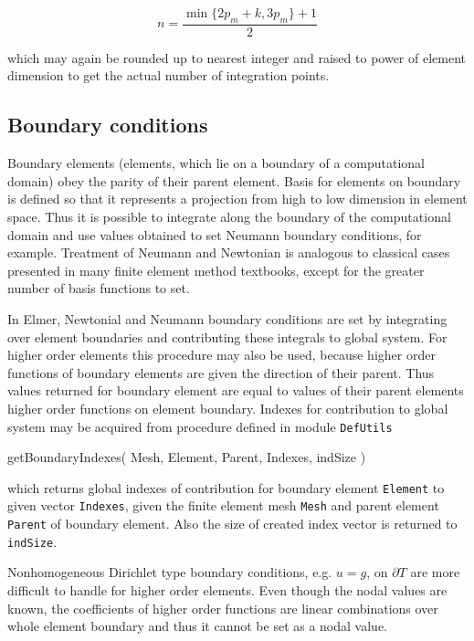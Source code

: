 \begin{equation}
n=\frac{\min{\{2p_m+k,3p_m\}}+1}{2}
\end{equation}

\noindent which may again be rounded up to nearest integer and raised to power of element dimension to get the actual number of integration points. 

\subsection{Boundary conditions}

Boundary elements (elements, which lie on a boundary of a computational domain) obey the parity of their parent element. Basis for elements on boundary is defined so that it represents a projection from high to low dimension in element space. Thus it is possible to integrate along the boundary of the computational domain and use values obtained to set Neumann boundary conditions, for example. Treatment of Neumann and Newtonian is analogous to classical cases presented in many finite element method textbooks, except for the greater number of basis functions to set. 

In Elmer, Newtonial and Neumann boundary conditions are set by integrating over element boundaries and contributing these integrals to global system. For higher order elements this procedure may also be used, because higher order functions of boundary elements are given the direction of their parent. Thus values returned for boundary element are equal to values of their parent elements higher order functions on element boundary. Indexes for contribution to global system may be acquired from procedure defined in module \texttt{DefUtils}

\ttbegin
getBoundaryIndexes( Mesh, Element, Parent, Indexes, indSize )
\ttend

\noindent which returns global indexes of contribution for boundary element \texttt{Element} to given vector \texttt{Indexes}, given the finite element mesh \texttt{Mesh} and parent element \texttt{Parent} of boundary element. Also the size of created index vector is returned to \texttt{indSize}. 

Nonhomogeneous Dirichlet type boundary conditions, e.g. $u=g$, on $\partial T$ are more difficult to handle for higher order elements. Even though the nodal values are known, the coefficients of higher order functions are linear combinations over whole element boundary and thus it cannot be set as a nodal value.

